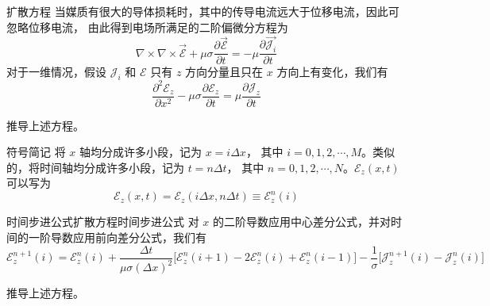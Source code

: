 \begin{definition}{扩散方程}
    当媒质有很大的导体损耗时，其中的传导电流远大于位移电流，因此可忽略位移电流，
    由此得到电场所满足的二阶偏微分方程为
    \begin{equation}
        \nabla \times \nabla \times \vec{\mathscr{E}}
        +\mu \sigma \frac{\partial \vec{\mathscr{E}}}{\partial t}
        =-\mu \frac{\partial \vec{\mathscr{J}_i}}{\partial t}
    \end{equation}
    对于一维情况，假设 $\mathscr{J}_i$ 和 $\mathscr{E}$ 
    只有 $z$ 方向分量且只在 $x$ 方向上有变化，我们有
    \begin{equation}
        \frac{\partial^2 \mathscr{E}_z}{\partial x^2}
        -\mu \sigma \frac{\partial \mathscr{E}_z}{\partial t}
        =\mu \frac{\partial \mathscr{J}_z}{\partial t}
        \label{一维扩散方程}
    \end{equation}
\end{definition}

\begin{exercise}
    推导上述方程。
\end{exercise}

\begin{definition}{符号简记}
    将 $x$ 轴均分成许多小段，记为 $x=i\Delta x$，
    其中 $i=0,1,2,\cdots,M$。类似的，将时间轴均分成许多小段，记为 $t=n\Delta t$，
    其中 $n=0,1,2,\cdots,N$。$\mathscr{E}_z(x,t)$ 可以写为
    \begin{equation}
        \mathscr{E}_z(x,t)=\mathscr{E}_z(i\Delta x,n\Delta t)
        \equiv \mathscr{E}_z^n(i)
    \end{equation}
\end{definition}

\begin{theorem}{时间步进公式}{扩散方程时间步进公式}
    对 $x$ 的二阶导数应用中心差分公式，并对时间的一阶导数应用前向差分公式，我们有
    \begin{equation}
        \mathscr{E}_z^{n+1}(i)=\mathscr{E}_z^n(i)
        +\frac{\Delta t}{\mu \sigma (\Delta x)^2}
        \Big[\mathscr{E}_z^n(i+1)-2\mathscr{E}_z^n(i)+\mathscr{E}_z^n(i-1)\Big]
        -\frac{1}{\sigma}\Big[\mathscr{J}_z^{n+1}(i)-\mathscr{J}_z^{n}(i)\Big]
    \end{equation}
\end{theorem}

\begin{exercise}
    推导上述方程。
\end{exercise}

